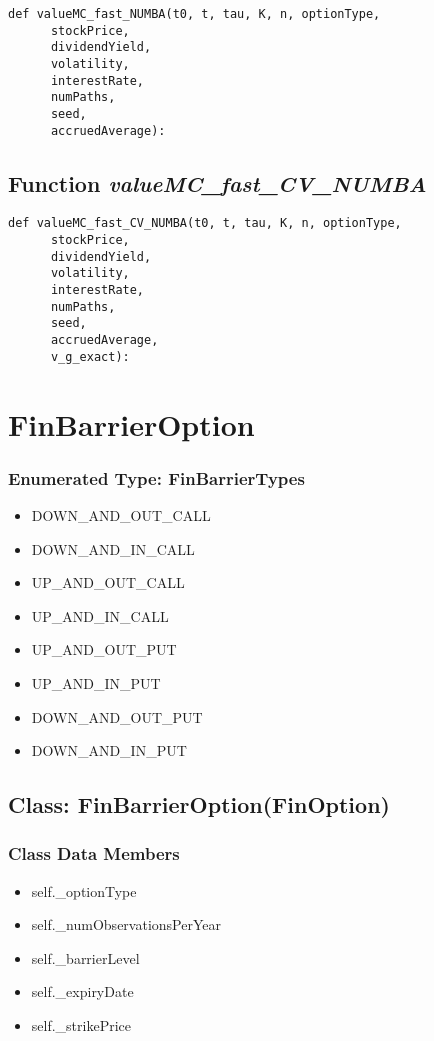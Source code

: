 \documentclass[twoside,11pt]{book}
\begin{document}
\begin{lstlisting}
def valueMC_fast_NUMBA(t0, t, tau, K, n, optionType,
      stockPrice,
      dividendYield,
      volatility,
      interestRate,
      numPaths,
      seed,
      accruedAverage):
\end{lstlisting}

\subsection{Function {\it valueMC\_fast\_CV\_NUMBA}}


\begin{lstlisting}
def valueMC_fast_CV_NUMBA(t0, t, tau, K, n, optionType,
      stockPrice,
      dividendYield,
      volatility,
      interestRate,
      numPaths,
      seed,
      accruedAverage, 
      v_g_exact):
\end{lstlisting}

\newpage
\section{FinBarrierOption}

\subsubsection{Enumerated Type: FinBarrierTypes}
\begin{itemize}
\item{DOWN\_AND\_OUT\_CALL}
\item{DOWN\_AND\_IN\_CALL}
\item{UP\_AND\_OUT\_CALL}
\item{UP\_AND\_IN\_CALL}
\item{UP\_AND\_OUT\_PUT}
\item{UP\_AND\_IN\_PUT}
\item{DOWN\_AND\_OUT\_PUT}
\item{DOWN\_AND\_IN\_PUT}
\end{itemize}

\subsection{Class: FinBarrierOption(FinOption)}


\subsubsection{Class Data Members}
\begin{itemize}
\item{self.\_optionType}
\item{self.\_numObservationsPerYear}
\item{self.\_barrierLevel}
\item{self.\_expiryDate}
\item{self.\_strikePrice}
\end{itemize}
\end{document}
